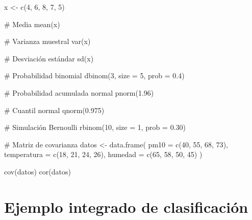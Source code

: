 \documentclass[
  spanish,
  11pt,
  letterpaper,
  DIV=11,
  numbers=noendperiod]{scrreprt}
\newenvironment{Shaded}{\begin{snugshade}}{\end{snugshade}}
\newcommand{\AttributeTok}[1]{\textcolor[rgb]{0.40,0.45,0.13}{#1}}
\newcommand{\CommentTok}[1]{\textcolor[rgb]{0.37,0.37,0.37}{#1}}
\newcommand{\DecValTok}[1]{\textcolor[rgb]{0.68,0.00,0.00}{#1}}
\newcommand{\FloatTok}[1]{\textcolor[rgb]{0.68,0.00,0.00}{#1}}
\newcommand{\FunctionTok}[1]{\textcolor[rgb]{0.28,0.35,0.67}{#1}}
\newcommand{\NormalTok}[1]{\textcolor[rgb]{0.00,0.23,0.31}{#1}}
\newcommand{\OtherTok}[1]{\textcolor[rgb]{0.00,0.23,0.31}{#1}}
\theoremstyle{definition}
\theoremstyle{plain}
\theoremstyle{definition}
\theoremstyle{remark}
\begin{document}
\begin{Shaded}
\begin{Highlighting}[]
\NormalTok{x }\OtherTok{\textless{}{-}} \FunctionTok{c}\NormalTok{(}\DecValTok{4}\NormalTok{, }\DecValTok{6}\NormalTok{, }\DecValTok{8}\NormalTok{, }\DecValTok{7}\NormalTok{, }\DecValTok{5}\NormalTok{)}

\CommentTok{\# Media}
\FunctionTok{mean}\NormalTok{(x)}

\CommentTok{\# Varianza muestral}
\FunctionTok{var}\NormalTok{(x)}

\CommentTok{\# Desviación estándar}
\FunctionTok{sd}\NormalTok{(x)}

\CommentTok{\# Probabilidad binomial}
\FunctionTok{dbinom}\NormalTok{(}\DecValTok{3}\NormalTok{, }\AttributeTok{size =} \DecValTok{5}\NormalTok{, }\AttributeTok{prob =} \FloatTok{0.4}\NormalTok{)}

\CommentTok{\# Probabilidad acumulada normal}
\FunctionTok{pnorm}\NormalTok{(}\FloatTok{1.96}\NormalTok{)}

\CommentTok{\# Cuantil normal}
\FunctionTok{qnorm}\NormalTok{(}\FloatTok{0.975}\NormalTok{)}

\CommentTok{\# Simulación Bernoulli}
\FunctionTok{rbinom}\NormalTok{(}\DecValTok{10}\NormalTok{, }\AttributeTok{size =} \DecValTok{1}\NormalTok{, }\AttributeTok{prob =} \FloatTok{0.30}\NormalTok{)}

\CommentTok{\# Matriz de covarianza}
\NormalTok{datos }\OtherTok{\textless{}{-}} \FunctionTok{data.frame}\NormalTok{(}
  \AttributeTok{pm10 =} \FunctionTok{c}\NormalTok{(}\DecValTok{40}\NormalTok{, }\DecValTok{55}\NormalTok{, }\DecValTok{68}\NormalTok{, }\DecValTok{73}\NormalTok{),}
  \AttributeTok{temperatura =} \FunctionTok{c}\NormalTok{(}\DecValTok{18}\NormalTok{, }\DecValTok{21}\NormalTok{, }\DecValTok{24}\NormalTok{, }\DecValTok{26}\NormalTok{),}
  \AttributeTok{humedad =} \FunctionTok{c}\NormalTok{(}\DecValTok{65}\NormalTok{, }\DecValTok{58}\NormalTok{, }\DecValTok{50}\NormalTok{, }\DecValTok{45}\NormalTok{)}
\NormalTok{)}

\FunctionTok{cov}\NormalTok{(datos)}
\FunctionTok{cor}\NormalTok{(datos)}
\end{Highlighting}
\end{Shaded}

\section{Ejemplo integrado de
clasificación}\label{ejemplo-integrado-de-clasificaciuxf3n}
\end{document}
